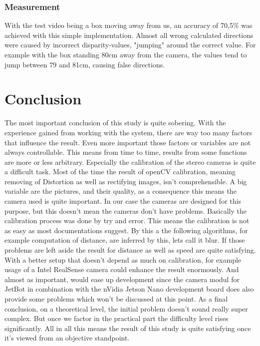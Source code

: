 \documentclass[journal,onecolumn]{IEEEtran}
\begin{document}
\subsubsection{Measurement}
\noindent With the test video being a box moving away from us, an accuracy of 70,5\% was achieved with this simple implementation. Almost all wrong calculated directions were caused by incorrect disparity-values, "jumping" around the correct value. For example with the box standing 80cm away from the camera, the values tend to jump between 79 and 81cm, causing false directions.


\section{Conclusion}
\noindent The most important conclusion of this study is quite sobering. With the experience gained from working with the system, there are way too many factors that influence the result. Even more important those factors or variables are not always controllable. This means from time to time, results from some functions are more or less arbitrary. Especially the calibration of the stereo cameras is quite a difficult task. Most of the time the result of openCV calibration, meaning removing of Distortion as well as rectifying images, isn't comprehensible. A big variable are the pictures, and their quality, as a consequence this means the camera used is quite important. In our case the cameras are designed for this purpose, but this doesn't mean the cameras don't have problems. Basically the calibration process was done by try and error. This means the calibration is not as easy as most documentations suggest. By this a the following algorithms, for example computation of distance, are inferred by this, lets call it blur. \newline
If those problems are left aside the result for distance as well as speed are quite satisfying. With a better setup that doesn't depend as much on calibration, for example usage of a Intel RealSense camera could enhance the result enormously. And almost as important, would ease up development since the camera modul for JetBot in combination with the nVidia Jetson Nano development board does also provide some problems which won't be discussed at this point. \newline
As a final conclusion, on a theoretical level, the initial problem doesn't sound really super complex. But once we factor in the practical part the difficulty level rises significantly. All in all this means the result of this study is quite satisfying once it's viewed from an objective standpoint.
\appendices
\end{document}
